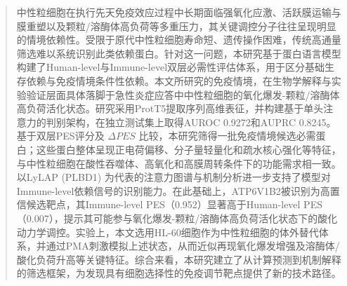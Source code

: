 

\begin{abstract}
中性粒细胞在执行先天免疫效应过程中长期面临强氧化应激、活跃膜运输与膜重塑以及颗粒/溶酶体高负荷等多重压力，其关键调控分子往往呈现明显的情境依赖性。受限于原代中性粒细胞寿命短、遗传操作困难，传统高通量筛选难以系统识别此类依赖蛋白。针对这一问题，本研究基于蛋白语言模型构建了Human-level与Immune-level双层必需性评估体系，用于区分基础生存依赖与免疫情境条件性依赖。本文所研究的免疫情境，在生物学解释与实验验证层面具体落脚于急性炎症应答中中性粒细胞的氧化爆发-颗粒/溶酶体高负荷活化状态。研究采用ProtT5提取序列高维表征，并构建基于单头注意力的判别架构，在独立测试集上取得AUROC 0.9272和AUPRC 0.8245。基于双层PES评分及 $\Delta PES$ 比较，本研究筛得一批免疫情境候选必需蛋白；这些蛋白整体呈现正电荷偏移、分子量轻量化和疏水核心强化等特征，与中性粒细胞在酸性吞噬体、高氧化和高膜周转条件下的功能需求相一致。以LyLAP (PLBD1) 为代表的注意力图谱与机制分析进一步支持了模型对Immune-level依赖信号的识别能力。在此基础上，ATP6V1B2被识别为高置信候选靶点，其Immune-level PES（0.952）显著高于Human-level PES（0.007），提示其可能参与氧化爆发-颗粒/溶酶体高负荷活化状态下的酸化动力学调控。实验上，本文选用HL-60细胞作为中性粒细胞的体外替代体系，并通过PMA刺激模拟上述状态，从而近似再现氧化爆发增强及溶酶体/酸化负荷升高等关键特征。综合来看，本研究建立了从计算预测到机制解释的筛选框架，为发现具有细胞选择性的免疫调节靶点提供了新的技术路径。

\end{abstract}

